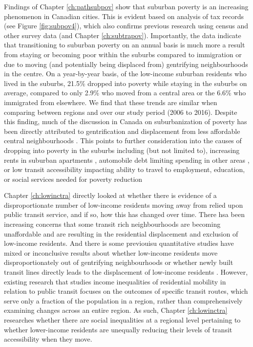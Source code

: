 Findings of Chapter \ref{ch:pathsubpov} show that suburban poverty is an increasing phenomenon in Canadian cities. This is evident based on analysis of tax records (see Figure \ref{fig:subpov4}), which also confirms previous research using census and other survey data \cite{ades_are_2012,breau_pulling_2018,grant_changing_2020} (and Chapter \ref{ch:subtrapov}). Importantly, the data indicate that transitioning to suburban poverty on an annual basis is much more a result from staying or becoming poor within the suburbs compared to immigration or due to moving (and potentially being displaced from) gentrifying neighbourhoods in the centre. On a year-by-year basis, of the low-income suburban residents who lived in the suburbs, 21.5\% dropped into poverty while staying in the suburbs on average, compared to only 2.9\% who moved from a central area or the 6.6\% who immigrated from elsewhere. We find that these trends are similar when comparing between regions and over our study period (2006 to 2016). Despite this finding, much of the discussion in Canada on suburbanization of poverty has been directly attributed to gentrification and displacement from less affordable central neighbourhoods \cite{grant_changing_2020}. This points to further consideration into the causes of dropping into poverty in the suburbs including (but not limited to), increasing rents in suburban apartments \cite{august_gentrification_2018}, automobile debt limiting spending in other areas \cite{walks_driving_2018}, or low transit accessibility impacting ability to travel to employment, education, or social services needed for poverty reduction \cite{allen_planning_2020} 

Chapter \ref{ch:lowinctra} directly looked at whether there is evidence of a disproportionate number of low-income residents moving away from relied upon public transit service, and if so, how this has changed over time. There hsa been increasing concerns that some transit rich neighbourhoods are becoming unaffordable and are resulting in the residential displacement and exclusion of low-income residents. And there is some previouisu quantitative studies have mixed or inconclusive results about whether low-income residents move disproportionately out of gentrifying neighbourhoods or whether newly built transit lines directly leads to the displacement of low-income residents \cite{rayle_investigating_2015, zuk_gentrification_2018,padeiro_transit-oriented_2019,delmelle_transit-induced_2021}. However, existing research that studies income inequalities of residential mobility in relation to public transit focuses on the outcomes of specific transit routes, which serve only a fraction of the population in a region, rather than comprehensively examining changes across an entire region. As such, Chapter \ref{ch:lowinctra} researches whether there are social inequalities at a regional level pertaining to whether lower-income residents are unequally reducing their levels of transit accessibility when they move. 

